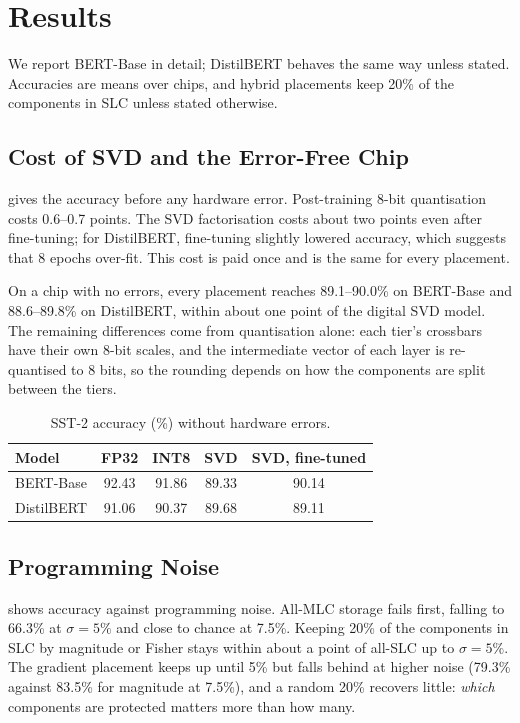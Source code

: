 \section{Results}\label{sec:results}

We report BERT-Base in detail; DistilBERT behaves the same way unless stated.  Accuracies are means over chips, and hybrid placements keep 20\% of the
components in SLC unless stated otherwise.

\subsection{Cost of SVD and the Error-Free Chip}
 gives the accuracy before any hardware error. Post-training 8-bit quantisation costs
0.6--0.7 points. The SVD factorisation costs about two points even after fine-tuning; for DistilBERT,
fine-tuning slightly lowered accuracy, which suggests that 8 epochs over-fit. This cost is paid once and
is the same for every placement.

On a chip with no errors, every placement reaches 89.1--90.0\% on BERT-Base and 88.6--89.8\% on
DistilBERT, within about one point of the digital SVD model. The remaining differences come from
quantisation alone: each tier's crossbars have their own 8-bit scales, and the intermediate vector of
each layer is re-quantised to 8 bits, so the rounding depends on how the components are split between the
tiers.

\begin{table}[t]
\centering\footnotesize
\caption{SST-2 accuracy (\%) without hardware errors.}\label{tab:svd}
\setlength{\tabcolsep}{4pt}
\begin{tabular}{@{}lcccc@{}}
\toprule
Model & FP32 & INT8 & SVD & SVD, fine-tuned \\
\midrule
BERT-Base  & 92.43 & 91.86 & 89.33 & 90.14 \\
DistilBERT & 91.06 & 90.37 & 89.68 & 89.11 \\
\bottomrule
\end{tabular}
\end{table}

\subsection{Programming Noise}
 shows accuracy against programming noise. All-MLC storage fails first, falling to 66.3\% at
$\sigma=5\%$ and close to chance at 7.5\%. Keeping 20\% of the components in SLC by magnitude or Fisher stays
within about a point of all-SLC up to $\sigma=5\%$. The gradient placement keeps up until 5\% but falls behind
at higher noise (79.3\% against 83.5\% for magnitude at 7.5\%), and a random 20\% recovers little:
\emph{which} components are protected matters more than how many.

